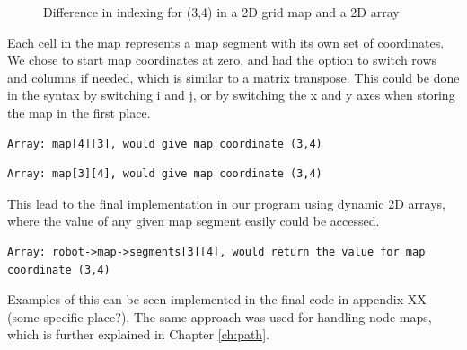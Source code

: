 \begin{figure}[htp]
    \centering
    \hspace{0.05\textwidth}  
    \caption{Difference in indexing for (3,4) in a 2D grid map and a 2D array}
    \label{fig:floor_plans}
\end{figure}

Each cell in the map represents a map segment with its own set of coordinates. 
We chose to start map coordinates at zero, and had the option to switch rows and columns if needed, 
which is similar to a matrix transpose. 
This could be done in the syntax by switching i and j, 
or by switching the x and y axes when storing the map in the first place.
\\

\begin{lstlisting}[caption={Example of map segment before rows and columns are switched}]
Array: map[4][3], would give map coordinate (3,4)
\end{lstlisting}

\begin{lstlisting}[caption={Example of map segment after switching rows and columns}]
Array: map[3][4], would give map coordinate (3,4)
\end{lstlisting}

This lead to the final implementation in our program using dynamic 2D arrays, 
where the value of any given map segment easily could be accessed. 
\\
\begin{lstlisting}[caption={Example of implementation in the final code}]
Array: robot->map->segments[3][4], would return the value for map coordinate (3,4)
\end{lstlisting}
Examples of this can be seen implemented in the final code in appendix XX (some specific place?). 
The same approach was used for handling node maps, which is further explained in Chapter \ref{ch:path}.

